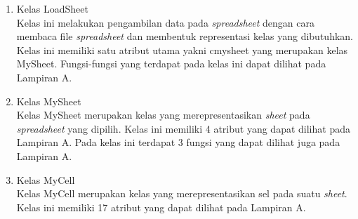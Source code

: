 \begin{enumerate}
	\item Kelas LoadSheet\\
	      Kelas ini melakukan pengambilan data pada \textit{spreadsheet} dengan cara membaca file \textit{spreadsheet} dan membentuk representasi kelas yang dibutuhkan. Kelas ini memiliki satu atribut utama yakni cmysheet yang merupakan kelas MySheet. Fungsi-fungsi yang terdapat pada kelas ini dapat dilihat pada Lampiran A.

	\item Kelas MySheet\\
	      Kelas MySheet merupakan kelas yang merepresentasikan \textit{sheet} pada \textit{spreadsheet} yang dipilih. Kelas ini memiliki 4 atribut yang dapat dilihat pada Lampiran A. Pada kelas ini terdapat 3 fungsi yang dapat dilihat juga pada Lampiran A.

	\item Kelas MyCell\\
	      Kelas MyCell merupakan kelas yang merepresentasikan sel pada suatu \textit{sheet}. Kelas ini memiliki 17 atribut yang dapat dilihat pada Lampiran A.
\end{enumerate}



